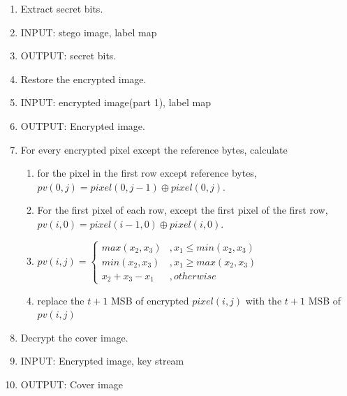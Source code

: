 \documentclass{article}
\begin{document}
\begin{enumerate}
	\item Extract secret bits.
	\item[] INPUT: stego image, label map
	\item[] OUTPUT: secret bits.
	      
	\item Restore the encrypted image.
	\item[] INPUT: encrypted image(part 1), label map
	\item[] OUTPUT: Encrypted image.
	\item[] For every encrypted pixel except the reference bytes, calculate
	      \begin{enumerate}
		      \item for the pixel in the first row except reference bytes, $pv(0, j) = pixel(0, j - 1) \oplus pixel(0, j). $
		      \item For the first pixel of each row, except the first pixel of the first row, $pv(i, 0) = pixel(i - 1, 0) \oplus pixel(i, 0). $
		      \item 
		            $pv(i, j) = \left\{
			            \begin{array}{rl}
				            max(x_2, x_3)   & , x_1 \leq min(x_2, x_3) \\
				            min(x_2, x_3)   & , x_1 \geq max(x_2, x_3) \\
				            x_2 + x_3 - x_1 & , otherwise
			            \end{array} \right. $
		      \item replace the $t+1$ MSB of encrypted $pixel(i, j)$ with the $t+1$ MSB of $pv(i, j)$
	      \end{enumerate}
	      
	\item Decrypt the cover image.
	\item[] INPUT: Encrypted image, key stream
	\item[] OUTPUT: Cover image
	      
\end{enumerate}

\pagebreak
\end{document}
